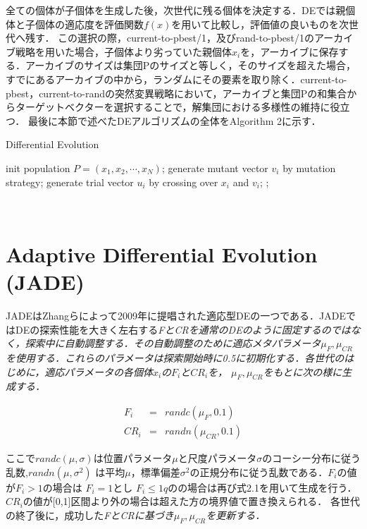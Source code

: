 \documentclass[a4paper,11pt,oneside,openany]{jsbook}
\begin{document}
全ての個体が子個体を生成した後，次世代に残る個体を決定する．DEでは親個体と子個体の適応度を評価関数$f(x)$を用いて比較し，評価値の良いものを次世代へ残す．
この選択の際，current-to-pbest/1，及びrand-to-pbest/1のアーカイブ戦略を用いた場合，子個体より劣っていた親個体$x_{i}$を，アーカイブに保存する．アーカイブのサイズは集団Pのサイズと等しく，そのサイズを超えた場合，すでにあるアーカイブの中から，ランダムにその要素を取り除く．current-to-pbest，current-to-randの突然変異戦略において，アーカイブと集団Pの和集合からターゲットベクターを選択することで，解集団における多様性の維持に役立つ．
最後に本節で述べたDEアルゴリズムの全体をAlgorithm 2に示す．
\begin{algorithm}                      
\caption{Differential Evolution}         
\label{alg:pbnf}                          
\begin{algorithmic}  
\STATE init population ${P} = (x_1, x_2, \cdots, x_N)$;
        \STATE generate mutant vector {$v_i$} by mutation strategy;
        \STATE generate trial vector {$u_i$} by crossing over {$x_i$} and {$v_i$}; 
    \ENDFOR
            ;
        \ENDIF
    \ENDFOR
\ENDWHILE
\end{algorithmic}
\end{algorithm}　　　　　　　　　　　　　　　　　　　　　


\section{Adaptive Differential Evolution (JADE)}
JADE\cite{JADE}はZhangらによって2009年に提唱された適応型DEの一つである．JADEではDEの探索性能を大きく左右する\sl{F}と\sl{CR}を通常のDEのように固定するのではなく，探索中に自動調整する．その自動調整のために適応メタパラメータ$\mu _F,\mu _{CR}$ を使用する．これらのパラメータは探索開始時に0.5に初期化する．各世代のはじめに，適応パラメータの各個体$x_i$の$F_i$と$CR_i$を，
$\mu _F,\mu _{CR}$をもとに次の様に生成する．

\begin{eqnarray}
  F_i & = & randc(\mu _F, 0.1) \\
  CR_i & = & randn(\mu _{CR}, 0.1)
\end{eqnarray}

ここで$randc(\mu,　\sigma)$は位置パラメータ$\mu$と尺度パラメータ$\sigma$のコーシー分布に従う乱数,$randn(\mu,\sigma^2)$ は平均$\mu$，標準偏差$\sigma^2$の正規分布に従う乱数である．$F_i$の値が$F_i>1$の場合は
$F_i=1$とし $F_i\le1qの$の場合は再び式2.1を用いて生成を行う．$CR_i$の値が[0,1]区間より外の場合は超えた方の境界値で置き換えられる．
各世代の終了後に，成功した\sl{F}と\sl{CR}に基づき$\mu _F, \mu _{CR}$を更新する．
\end{document}
